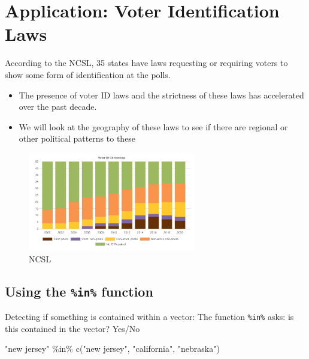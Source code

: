 \documentclass[
  letterpaper,
  DIV=11,
  numbers=noendperiod]{scrreprt}
\newenvironment{Shaded}{\begin{snugshade}}{\end{snugshade}}
\newcommand{\FunctionTok}[1]{\textcolor[rgb]{0.28,0.35,0.67}{#1}}
\newcommand{\NormalTok}[1]{\textcolor[rgb]{0.00,0.23,0.31}{#1}}
\newcommand{\SpecialCharTok}[1]{\textcolor[rgb]{0.37,0.37,0.37}{#1}}
\newcommand{\StringTok}[1]{\textcolor[rgb]{0.13,0.47,0.30}{#1}}
\providecommand{\tightlist}{%
  \setlength{\itemsep}{0pt}\setlength{\parskip}{0pt}}\usepackage{longtable,booktabs,array}
\begin{document}
\hypertarget{application-voter-identification-laws}{%
\section{Application: Voter Identification
Laws}\label{application-voter-identification-laws}}

According to the NCSL, 35 states have laws requesting or requiring
voters to show some form of identification at the polls.

\begin{itemize}
\tightlist
\item
  The presence of voter ID laws and the strictness of these laws has
  accelerated over the past decade.
\item
  We will look at the geography of these laws to see if there are
  regional or other political patterns to these
\end{itemize}

\begin{figure}

{\centering \includegraphics[width=0.65\textwidth,height=\textheight]{images/voteridc.png}

}

\caption{NCSL}

\end{figure}

\hypertarget{using-the-in-function}{%
\subsection{\texorpdfstring{Using the \texttt{\%in\%}
function}{Using the \%in\% function}}\label{using-the-in-function}}

Detecting if something is contained within a vector: The function
\texttt{\%in\%} asks: is this contained in the vector? Yes/No

\begin{Shaded}
\begin{Highlighting}[]
\StringTok{"new jersey"} \SpecialCharTok{\%in\%} \FunctionTok{c}\NormalTok{(}\StringTok{"new jersey"}\NormalTok{, }\StringTok{"california"}\NormalTok{, }\StringTok{"nebraska"}\NormalTok{)}
\end{Highlighting}
\end{Shaded}
\end{document}
